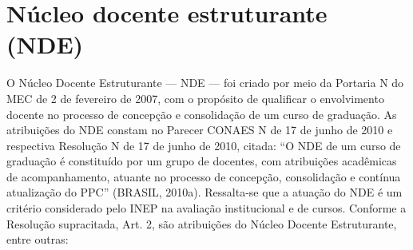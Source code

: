 \section{Núcleo docente estruturante (NDE)}

O Núcleo Docente Estruturante — NDE — foi criado por meio da Portaria N do MEC de 2 de fevereiro de 2007, com o propósito de qualificar o envolvimento docente no processo de concepção e consolidação de um curso de graduação. As atribuições do NDE constam no Parecer CONAES N de 17 de junho de 2010 e respectiva Resolução N de 17 de junho de 2010, citada: ``O NDE de um curso de graduação é constituído por um grupo de docentes, com atribuições acadêmicas de acompanhamento, atuante no processo de concepção, consolidação e contínua atualização do PPC'' (BRASIL, 2010a). Ressalta-se que a atuação do NDE é um critério considerado pelo INEP na avaliação institucional e de cursos. Conforme a Resolução supracitada, Art. 2, são atribuições do Núcleo Docente Estruturante, entre outras: 